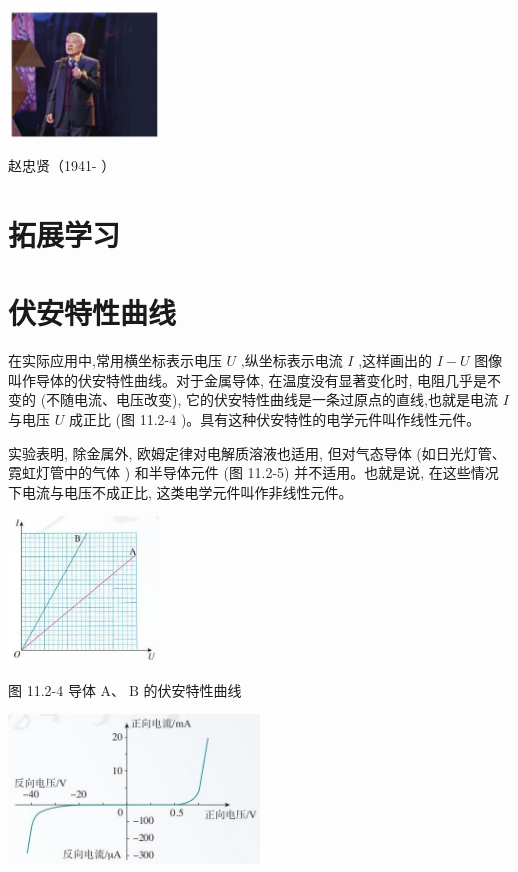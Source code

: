 \documentclass[10pt]{article}
\begin{document}
\begin{center}
\includegraphics[max width=0.3\textwidth]{images/01911d5f-8e38-70c0-b5b8-2b399bd115b6_65_282757.jpg}
\end{center}

赵忠贤（1941- ）

\section*{拓展学习}

\section*{伏安特性曲线}

在实际应用中,常用横坐标表示电压 \(U\) ,纵坐标表示电流 \(I\) ,这样画出的 \(I - U\) 图像叫作导体的伏安特性曲线。对于金属导体, 在温度没有显著变化时, 电阻几乎是不变的 (不随电流、电压改变), 它的伏安特性曲线是一条过原点的直线,也就是电流 \(I\) 与电压 \(U\) 成正比 (图 11.2-4 )。具有这种伏安特性的电学元件叫作线性元件。

实验表明, 除金属外, 欧姆定律对电解质溶液也适用, 但对气态导体 (如日光灯管、霓虹灯管中的气体 ) 和半导体元件 (图 11.2-5) 并不适用。也就是说, 在这些情况下电流与电压不成正比, 这类电学元件叫作非线性元件。

\begin{center}
\includegraphics[max width=0.3\textwidth]{images/01911d5f-8e38-70c0-b5b8-2b399bd115b6_65_231325.jpg}
\end{center}

图 11.2-4 导体 \(\mathrm{A}\text{、}\mathrm{\;B}\) 的伏安特性曲线

\begin{center}
\includegraphics[max width=0.5\textwidth]{images/01911d5f-8e38-70c0-b5b8-2b399bd115b6_65_735703.jpg}
\end{center}
\end{document}
